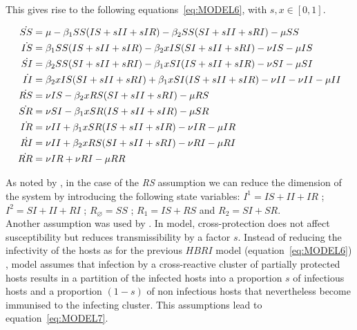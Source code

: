 This gives rise to the following equations~\eqref{eq:MODEL6}, with
$s,x \in [0,1]$.


\begin{align}
\dot{SS} & = \mu -\beta_1 SS (IS + s II + s IR) -\beta_2 SS (SI+ s II + s RI) -\mu SS  \label{eq:MODEL6}\\
\dot{IS} & = \beta_1 SS (IS+ s II + s IR) -\beta_2 x IS (SI+ s II + s RI) -\nu IS -\mu IS \notag \\
\dot{SI} & = \beta_2 SS (SI+ s II + s RI) -\beta_1 x SI (IS+ s II + s IR) -\nu SI -\mu SI \notag \\
\dot{II} & = \beta_2 x IS (SI+ s II + s RI) + \beta_1 x SI (IS+ s II + s IR) -\nu II -\nu II -\mu II \notag \\
\dot{RS} & = \nu IS -\beta_2 x RS (SI+ s II + s RI) -\mu RS \notag \\
\dot{SR} & = \nu SI -\beta_1 x SR (IS+ s II + s IR) -\mu SR \notag \\
\dot{IR} & = \nu II + \beta_1 x SR (IS+ s II + s IR) -\nu IR -\mu IR \notag \\
\dot{RI} & = \nu II + \beta_2 x RS (SI+ s II + s RI) -\nu RI -\mu RI \notag \\
\dot{RR} & = \nu IR + \nu RI -\mu RR \notag 
\end{align}

As noted by \citet{Kamo2002}, in the case of the \textit{RS}
assumption we can reduce the dimension of the system by introducing
the following state variables: $I^1 = IS+ II + IR$ ; $I^2 = SI+ II +
RI$ ; $R_\varnothing = SS$ ; $R_1 = IS + RS$ and $R_2 = SI + SR$.\\


Another assumption was used by \citet{Gupta1998}. In \citet{Gupta1998}
model, cross-protection does not affect susceptibility but reduces
transmissibility by a factor $s$. Instead of reducing the infectivity
of the hosts as for the previous $HBRI$ model
(equation~\ref{eq:MODEL6}) , \citet{Gupta1998} model assumes that
infection by a cross-reactive cluster of partially protected hosts
results in a partition of the infected hosts into a proportion $s$ of
infectious hosts and a proportion $(1-s)$ of non infectious hosts that
nevertheless become immunised to the infecting cluster. This
assumptions lead to equation~\ref{eq:MODEL7}.

